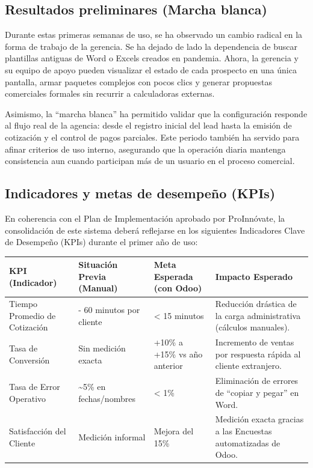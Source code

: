 \subsection{Resultados preliminares (Marcha blanca)}
\begin{indentedsubsection}
Durante estas primeras semanas de uso, se ha observado un cambio radical en la forma de trabajo de la gerencia. Se ha dejado de lado la dependencia de buscar plantillas antiguas de Word o Excels creados en pandemia. Ahora, la gerencia y su equipo de apoyo pueden visualizar el estado de cada prospecto en una única pantalla, armar paquetes complejos con pocos clics y generar propuestas comerciales formales sin recurrir a calculadoras externas.

Asimismo, la ``marcha blanca'' ha permitido validar que la configuración responde al flujo real de la agencia: desde el registro inicial del lead hasta la emisión de cotización y el control de pagos parciales. Este periodo también ha servido para afinar criterios de uso interno, asegurando que la operación diaria mantenga consistencia aun cuando participan más de un usuario en el proceso comercial.
\end{indentedsubsection}

\subsection{Indicadores y metas de desempeño (KPIs)}
\begin{indentedsubsection}
En coherencia con el Plan de Implementación aprobado por ProInnóvate, la consolidación de este sistema deberá reflejarse en los siguientes Indicadores Clave de Desempeño (KPIs) durante el primer año de uso:
\end{indentedsubsection}

\renewcommand{\arraystretch}{1.35}
\begin{tabularx}{\textwidth}{|>{\raggedright\arraybackslash}p{3.1cm}|>{\raggedright\arraybackslash}p{3.0cm}|>{\raggedright\arraybackslash}p{2.8cm}|X|}
    \hline
    \textbf{KPI (Indicador)} & \textbf{Situación Previa (Manual)} & \textbf{Meta Esperada (con Odoo)} & \textbf{Impacto Esperado} \\ \hline
    Tiempo Promedio de Cotización & 45 - 60 minutos por cliente & < 15 minutos & Reducción drástica de la carga administrativa (cálculos manuales). \\ \hline
    Tasa de Conversión & Sin medición exacta & +10\% a +15\% vs año anterior & Incremento de ventas por respuesta rápida al cliente extranjero. \\ \hline
    Tasa de Error Operativo & \textasciitilde5\% en fechas/nombres & < 1\% & Eliminación de errores de ``copiar y pegar'' en Word. \\ \hline
    Satisfacción del Cliente & Medición informal & Mejora del 15\% & Medición exacta gracias a las Encuestas automatizadas de Odoo. \\ \hline
\end{tabularx}

